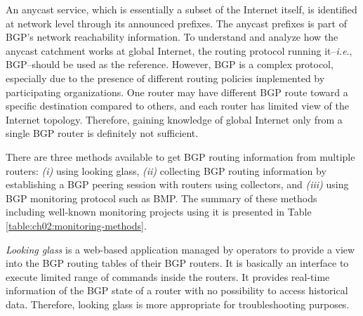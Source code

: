 

An anycast service, which is essentially a subset of the Internet itself, is identified at network level through its announced prefixes. The anycast prefixes is part of BGP's network reachability information. To understand and analyze how the anycast catchment works at global Internet, the routing protocol running it--\textit{i.e}., BGP--should be used as the reference. However, BGP is a complex protocol, especially due to the presence of different routing policies implemented by participating organizations. One router may have different BGP route toward a specific destination compared to others, and each router has limited view of the Internet topology. Therefore, gaining knowledge of global Internet only from a single BGP router is definitely not sufficient. 

There are three methods available to get BGP routing information from multiple routers: \textit{(i)} using looking glass, \textit{(ii)} collecting BGP routing information by establishing a BGP peering session with routers using collectors, and \textit{(iii)} using BGP monitoring protocol such as BMP. The summary of these methods including well-known monitoring projects using it is presented in Table \ref{table:ch02:monitoring-methods}.

\textit{Looking glass} is a web-based application managed by operators to provide a view into the BGP routing tables of their BGP routers. It is basically an interface to execute limited range of commands inside the routers. It provides real-time information of the BGP state of a router with no possibility to access historical data. Therefore, looking glass is more appropriate for troubleshooting purposes.

